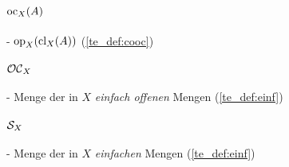     \paragraph{$\text{oc}_X(A)$} - \quad $\text{op}_X(\text{cl}_X(A))$ (\ref{te_def:cooc})

    \paragraph{$\mathcal{OC}_X$} - \quad Menge der in $X$ \textit{einfach offenen} Mengen (\ref{te_def:einf})

    \paragraph{$\mathcal{S}_X$} - \quad Menge der in $X$ \textit{einfachen} Mengen (\ref{te_def:einf})


